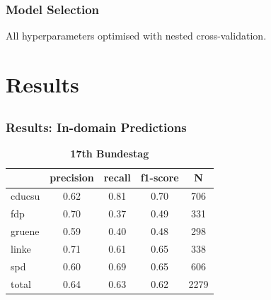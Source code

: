 \documentclass[]{beamer}
\begin{document}
\begin{frame}\frametitle{Model Selection}
\begin{block}{}
\centering
All hyperparameters optimised with nested cross-validation.
\end{block}
\end{frame}

\section{Results}
\subsection{}


\begin{frame}\frametitle{Results: In-domain Predictions}

\begin{table}[t]
\caption{
\label{tab:results_in-domain}
{\bf 17th Bundestag}}
\begin{center}
\begin{tabular}{lcccc}
    &         precision    &recall &  f1-score  & N  \\
\hline \hline
       cducsu   &    0.62  &    0.81  &    0.70  &     706\\
        fdp    &   0.70   &   0.37  &    0.49    &   331\\
     gruene &      0.59  &    0.40   &   0.48   &    298\\
      linke    &   0.71   &   0.61  &    0.65    &   338\\
        spd   &    0.60   &   0.69  &    0.65   &    606\\
\hline
 total &      0.64   &   0.63   &   0.62    &  2279 
%
\end{tabular}
\end{center}
\end{table}

\end{frame}
\end{document}
